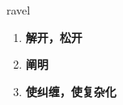 
\begin{frame}
{\huge ravel}
\begin{center}
\begin{enumerate}\Large
  \item \textbf{解开，松开}
  \item \textbf{阐明}
  \item \textbf{使纠缠，使复杂化}
\end{enumerate}
\end{center}
\end{frame}
